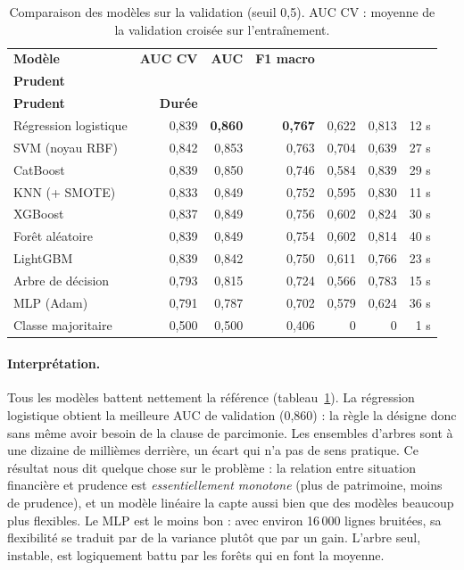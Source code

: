 \begin{table}[!htb]
  \centering
  \small
  \caption{Comparaison des modèles sur la validation (seuil 0,5). AUC CV : moyenne de la validation croisée sur l'entraînement.}
  \label{tab:profil_modeles}
  \begin{tabular}{@{}l r r r r r r@{}}
    \toprule
    \textbf{Modèle} & \textbf{AUC CV} & \textbf{AUC} & \textbf{F1 macro} & \shortstack[r]{\textbf{Précision}\\\textbf{Prudent}} & \shortstack[r]{\textbf{Rappel}\\\textbf{Prudent}} & \textbf{Durée} \\
    \midrule
    Régression logistique & 0,839 & \textbf{0,860} & \textbf{0,767} & 0,622 & 0,813 & 12 s \\
    SVM (noyau RBF)       & 0,842 & 0,853 & 0,763 & 0,704 & 0,639 & 27 s \\
    CatBoost              & 0,839 & 0,850 & 0,746 & 0,584 & 0,839 & 29 s \\
    KNN (+ SMOTE)         & 0,833 & 0,849 & 0,752 & 0,595 & 0,830 & 11 s \\
    XGBoost               & 0,837 & 0,849 & 0,756 & 0,602 & 0,824 & 30 s \\
    Forêt aléatoire       & 0,839 & 0,849 & 0,754 & 0,602 & 0,814 & 40 s \\
    LightGBM              & 0,839 & 0,842 & 0,750 & 0,611 & 0,766 & 23 s \\
    Arbre de décision     & 0,793 & 0,815 & 0,724 & 0,566 & 0,783 & 15 s \\
    MLP (Adam)            & 0,791 & 0,787 & 0,702 & 0,579 & 0,624 & 36 s \\
    Classe majoritaire    & 0,500 & 0,500 & 0,406 & 0     & 0     & 1 s \\
    \bottomrule
  \end{tabular}
\end{table}

\paragraph{Interprétation.} Tous les modèles battent nettement la référence (tableau~\ref{tab:profil_modeles}). La régression logistique obtient la meilleure AUC de validation (0,860) : la règle la désigne donc sans même avoir besoin de la clause de parcimonie. Les ensembles d'arbres sont à une dizaine de millièmes derrière, un écart qui n'a pas de sens pratique. Ce résultat nous dit quelque chose sur le problème : la relation entre situation financière et prudence est \emph{essentiellement monotone} (plus de patrimoine, moins de prudence), et un modèle linéaire la capte aussi bien que des modèles beaucoup plus flexibles. Le MLP est le moins bon : avec environ 16\,000 lignes bruitées, sa flexibilité se traduit par de la variance plutôt que par un gain. L'arbre seul, instable, est logiquement battu par les forêts qui en font la moyenne.

